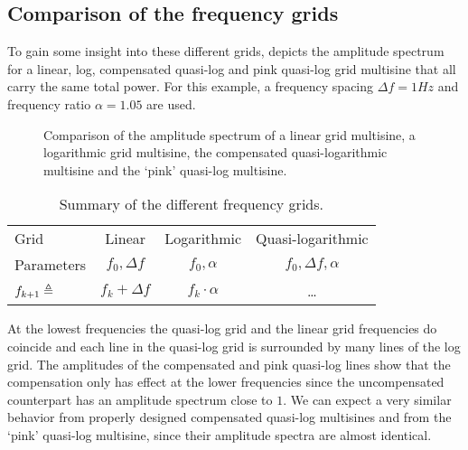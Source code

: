  \subsection{Comparison of the frequency grids}
  To gain some insight into these different grids,  depicts the amplitude spectrum for a linear, log, compensated quasi-log and pink quasi-log grid multisine that all carry the same total power.
  For this example, a frequency spacing $\Delta f = 1\unit{Hz}$ and frequency ratio $\alpha = 1.05$ are used.
  
  \begin{figure}[ht]
    \centering
    \setlength\figureheight{5cm}
    \setlength{}
    
    \caption[Amplitude spectrum for linear, logarithmic, quasi-logarithmic grids.]{Comparison of the amplitude spectrum of a linear grid multisine, a logarithmic grid multisine, the compensated quasi-logarithmic multisine and the `pink' quasi-log multisine.}%
    \label{fig:freqGrids}
  \end{figure}

  \begin{table}
  \centering
   \caption{Summary of the different frequency grids.}
    \begin{tabular}{lccc} 
    Grid & Linear & Logarithmic & Quasi-logarithmic \\

    Parameters & $f_0, \Delta f$ & $f_0, \alpha$ & $f_0, \Delta f, \alpha$ \\
    $f_{k+1} \triangleq$ & $f_{k} + \Delta f$ & $f_{k} \cdot \alpha$ & \ldots \\

    \end{tabular}
  \end{table}


  At the lowest frequencies the quasi-log grid and the linear grid frequencies do coincide and each line in the quasi-log grid is surrounded by many lines of the log grid.
  The amplitudes of the compensated and pink quasi-log lines show that the compensation only has effect at the lower frequencies since the uncompensated counterpart has an amplitude spectrum close to $1$.
  We can expect a very similar behavior from properly designed compensated quasi-log multisines and from the `pink' quasi-log multisine, since their amplitude spectra are almost identical.

